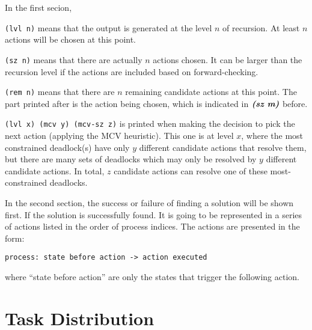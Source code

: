 In the first secion,

\texttt{(lvl n)} means that the output is generated at the level $n$ of recursion. At least $n$ actions will be chosen at this point.

\texttt{(sz n)} means that there are actually $n$ actions chosen. It can be larger than the recursion level if the actions are included based on forward-checking.

\texttt{(rem n)} means that there are $n$ remaining candidate actions at this point. The part printed after is the action being chosen, which is indicated in $\textbf{\emph{(sz\ m)}}$ before. 

\texttt{(lvl x) (mcv y) (mcv-sz z)} is printed when making the decision to pick the next action (applying the MCV heuristic). This one is at level $x$, where the most constrained deadlock(s) have only $y$ different candidate actions that resolve them, but there are many sets of deadlocks which may only be resolved by $y$ different candidate actions. In total, $z$ candidate actions can resolve one of these most-constrained deadlocks.

In the second section, the success or failure of finding a solution will be shown first. If the solution is successfully found. It is going to be represented in a series of actions listed in the order of process indices. The actions are presented in the form: 
\begin{center}
\texttt{process: state before action -> action executed}
\end{center}
where ``state before action'' are only the states that trigger the following action. 

\section{Task Distribution}

